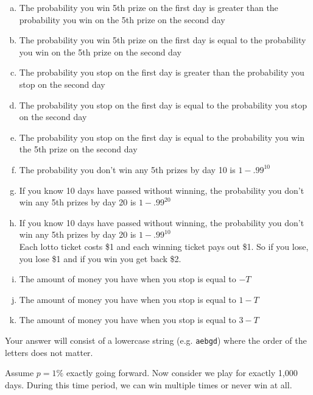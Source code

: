 \documentclass[12pt,landscape]{article}
\newcommand{\instr}{\small Your answer will consist of a lowercase string (e.g. \texttt{aebgd}) where the order of the letters does not matter. \normalsize}
\begin{document}
\vspace{-0.2cm}\benum{} 
\begin{enumerate}[(a)]
\item The probability you win 5th prize on the first day is greater than the probability you win on the 5th prize on the second day
\item The probability you win 5th prize on the first day is equal to the probability you win on the 5th prize on the second day

\item The probability you stop on the first day is greater than the probability you stop on the second day
\item The probability you stop on the first day is equal to the probability you stop on the second day

\item The probability you stop on the first day is equal to the probability you win the 5th prize on the second day

\item The probability you don't win any 5th prizes by day 10 is $1 - .99^{10}$

\item If you know 10 days have passed without winning, the probability you don't win any 5th prizes by day 20 is $1 - .99^{20}$
\item If you know 10 days have passed without winning, the probability you don't win any 5th prizes by day 20 is $1 - .99^{10}$ \\

Each lotto ticket costs \$1 and each winning ticket pays out \$1. So if you lose, you lose \$1 and if you win you get back \$2. 

\item The amount of money you have when you stop is equal to $-T$
\item The amount of money you have when you stop is equal to $1-T$
\item The amount of money you have when you stop is equal to $3-T$
\end{enumerate}
\eenum\instr\pagebreak





\problem{}  Assume $p=1\%$ exactly going forward. Now consider we play for exactly 1,000 days. During this time period, we can win multiple times or never win at all.
\end{document}
